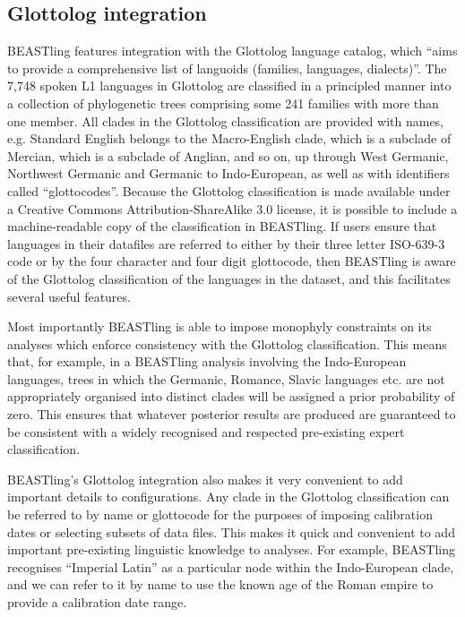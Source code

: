 \documentclass[twocolumn,10pt]{scrartcl}
\begin{document}
\subsection{Glottolog integration}

BEASTling features integration with the Glottolog language catalog\cite{Hammarstroem2016}, which ``aims to provide a comprehensive list of languoids (families, languages, dialects)''.  The 7,748 spoken L1 languages in Glottolog are classified in a principled manner into a collection of phylogenetic trees comprising some 241 families with more than one member.  All clades in the Glottolog classification are provided with names, e.g. Standard English belongs to the Macro-English clade, which is a subclade of Mercian, which is a subclade of Anglian, and so on, up through West Germanic, Northwest Germanic and Germanic to Indo-European, as well as with identifiers called ``glottocodes''.  Because the Glottolog classification is made available under a Creative Commons Attribution-ShareAlike 3.0 license, it is possible to include a machine-readable copy of the classification in BEASTling.  If users ensure that languages in their datafiles are referred to either by their three letter ISO-639-3 code or by the four character and four digit glottocode, then BEASTling is aware of the Glottolog classification of the languages in the dataset, and this facilitates several useful features.

Most importantly BEASTling is able to impose monophyly constraints on its analyses which enforce consistency with the Glottolog classification.  This means that, for example, in a BEASTling analysis involving the Indo-European languages, trees in which the Germanic, Romance, Slavic languages etc. are not appropriately organised into distinct clades will be assigned a prior probability of zero.  This ensures that whatever posterior results are produced are guaranteed to be consistent with a widely recognised and respected pre-existing expert classification.

BEASTling's Glottolog integration also makes it very convenient to add important details to configurations.  Any clade in the Glottolog classification can be referred to by name or glottocode for the purposes of imposing calibration dates or selecting subsets of data files.  This makes it quick and convenient to add important pre-existing linguistic knowledge to analyses.  For example, BEASTling recognises ``Imperial Latin'' as a particular node within the Indo-European clade, and we can refer to it by name to use the known age of the Roman empire to provide a calibration date range.
\end{document}
